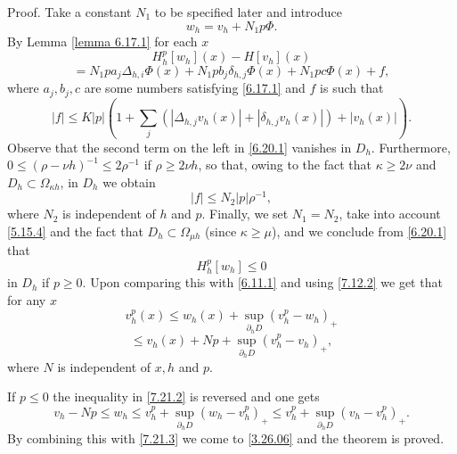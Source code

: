 \documentclass[11pt, reqno]{amsart}
\theoremstyle{definition}
\theoremstyle{remark}
\begin{document}
Proof. 
Take a constant $N_{1}$ to be specified later and
introduce 
$$
w_{h}=v_{h}+N_{1}p\Phi.
$$
 By Lemma \ref{lemma 6.17.1}
for each $x$
$$
H^{p}_{h}[ w_{h}](x) 
 -H[v_{h}] (x) 
$$
\begin{equation}
                                           \label{6.20.1}
=N_{1}pa_{j}\Delta_{h,i}\Phi(x)+N_{1}pb_{j}\delta_{h,j}\Phi(x)
+N_{1}pc\Phi(x)+f,
\end{equation}
where $a_{j},b_{j},c $ are some numbers satisfying
\eqref{6.17.1}  and $f$ is such that
$$
|f|\leq K|p| (1+ \sum_{j}(|\Delta_{h,j}v_{h}(x)|
+|\delta_{h,j}v_{h}(x)|)+ |v_{h}(x)|).
$$
 Observe that the second term on the left in \eqref{6.20.1}
vanishes in $D_{h}$. Furthermore, $0\leq(\rho-\nu h)^{-1}
\leq 2\rho^{-1}$ if $\rho\geq2\nu h$, so that, owing to the fact that
$\kappa\geq2\nu$ and $D_{ h}\subset\Omega_{\kappa h}$, in $D_{ h}$
we obtain
$$
|f|\leq N_{2}|p| \rho^{-1},
$$
where $N_{2}$ is independent of $h$ and $p$.
 Finally, we set $N_{1}=N_{2}$, take into account
\eqref{5.15.4} and the fact that $D_{h}\subset
\Omega_{\mu h}$ (since $\kappa\geq\mu$), and we 
conclude from \eqref{6.20.1} that
\begin{equation}
                                                \label{7.21.2}
H^{p}_{h}[ w_{h}]\leq0
\end{equation}
 in $D_{ h}$ if $p\geq0$. Upon comparing this with
 \eqref{6.11.1}
and using \eqref{7.12.2} we get that for any $x$
$$
 v^{p}_{h}(x )\leq w_{h}(x)
+\sup_{\partial_{ h}D} (v^{p}_{h}-w_{h})_{+}
$$
\begin{equation}
                                                \label{7.21.3}
\leq v_{h}(x)+N p +\sup_{\partial_{ h}D} (v^{p}_{h}-v_{h})_{+},
\end{equation}
where $N$ is independent of $x,h$ and $p$. 

If $p\leq0$ the inequality in \eqref{7.21.2} is
reversed and one gets
$$
v_{h}-Np\leq
w_{h}\leq v^{p}_{h}+\sup_{\partial_{ h}D} (w_{h}-v^{p}_{h})_{+}
\leq v^{p}_{h}+\sup_{\partial_{ h}D} (v_{h}-v^{p}_{h})_{+}.
$$
By combining this with \eqref{7.21.3} we come to
\eqref{3.26.06} and the theorem is proved.
\end{document}
